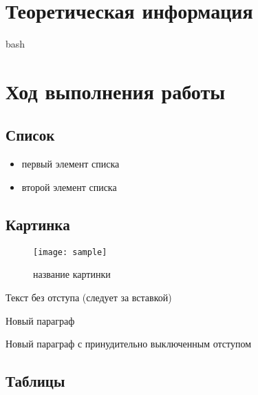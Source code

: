 \section{Теоретическая информация}
bash \cite{bash} \\

\section{Ход выполнения работы}

\subsection{Список}

\begin{itemize}
	\item первый элемент списка
	\item второй элемент списка
\end{itemize}


\subsection{Картинка}

\begin{figure}[H]
	\begin{center}
		\texttt{[image: sample]}
		\caption{название картинки}
		\label{pic:pic_name} %
	\end{center}
\end{figure}

Текст без отступа (следует за вставкой)

Новый параграф

\noindent Новый параграф с принудительно выключенным отступом


\subsection{Таблицы}

